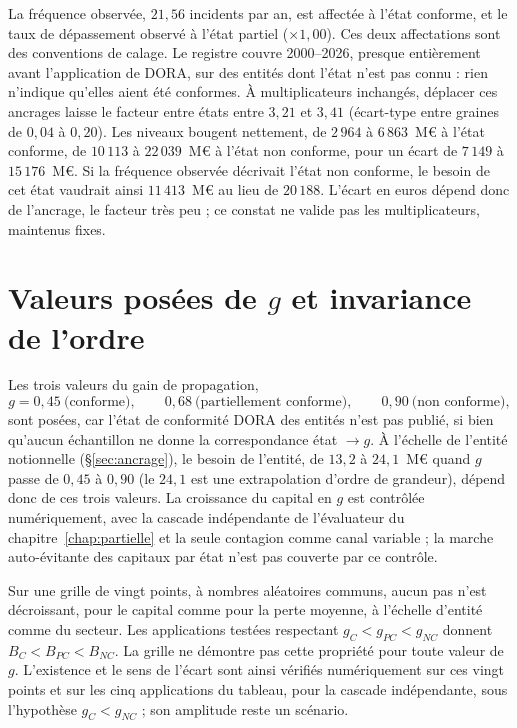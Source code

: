 La fréquence observée, $21{,}56$ incidents par an, est affectée à l'état conforme, et le taux de dépassement
observé à l'état partiel ($\times 1{,}00$). Ces deux affectations sont des conventions de calage. Le registre couvre
2000--2026, presque entièrement avant l'application de DORA, sur des entités dont l'état n'est pas connu : rien
n'indique qu'elles aient été conformes. À multiplicateurs inchangés, déplacer ces ancrages laisse le facteur entre
états entre $3{,}21$ et $3{,}41$ (écart-type entre graines de $0{,}04$ à $0{,}20$). Les niveaux bougent
nettement, de $2\,964$ à $6\,863$~M\euro{} à l'état conforme, de $10\,113$ à $22\,039$~M\euro{} à l'état non conforme, pour un
écart de $7\,149$ à $15\,176$~M\euro. Si la fréquence observée décrivait l'état non conforme, le besoin de cet état
vaudrait ainsi $11\,413$~M\euro{} au lieu de $20\,188$. L'écart en euros dépend donc de l'ancrage, le facteur très peu ; ce
constat ne valide pas les multiplicateurs, maintenus fixes.


\section{Valeurs posées de \texorpdfstring{$g$}{g} et invariance de l'ordre}
\label{sec:invariance-g}

Les trois valeurs du gain de propagation,
\[
  g = 0{,}45 \ \text{(conforme)}, \qquad 0{,}68 \ \text{(partiellement conforme)},
  \qquad 0{,}90 \ \text{(non conforme)},
\]
sont posées, car l'état de conformité DORA des entités n'est pas publié, si bien qu'aucun
échantillon ne donne la correspondance état $\to g$. À l'échelle de l'entité notionnelle
(\S\ref{sec:ancrage}), le besoin de l'entité, de $13{,}2$ à $24{,}1$~M\euro{} quand $g$ passe de $0{,}45$ à $0{,}90$ (le $24{,}1$ est une extrapolation
d'ordre de grandeur), dépend donc de ces trois valeurs. La croissance du capital en $g$ est contrôlée numériquement, avec la cascade indépendante de
l'évaluateur du chapitre~\ref{chap:partielle} et la seule contagion comme canal variable ; la marche
auto-évitante des capitaux par état n'est pas couverte par ce contrôle.

Sur une grille de vingt points, à nombres aléatoires communs, aucun pas n'est décroissant, pour le
capital comme pour la perte moyenne, à l'échelle d'entité comme du secteur. Les applications testées respectant $g_C < g_{PC} < g_{NC}$ donnent $B_C < B_{PC} < B_{NC}$. La grille ne démontre pas cette propriété pour toute valeur de $g$. L'existence et le sens de l'écart sont
ainsi vérifiés numériquement sur ces vingt points et sur les cinq applications du tableau, pour la cascade
indépendante, sous l'hypothèse $g_C<g_{NC}$ ; son amplitude reste un scénario.

